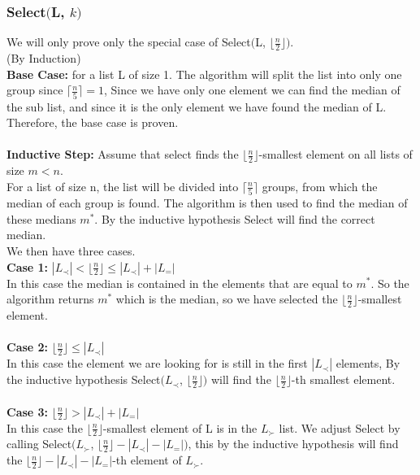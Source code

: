 \documentclass{article}
\begin{document}
      \subsubsection{Select$($L, $k)$} 
      We will only prove only the special case of Select$($L, $\lfloor \frac{n}{2} \rfloor)$. \\
        (By Induction) \\
        \textbf{Base Case:} for a list L of size 1. The algorithm will split the list into only one group since $\lceil \frac{n}{5} \rceil = 1$, Since we have only one element we can find the median of the sub list, and since it is the only element we have found the median of L. \\
        Therefore, the base case is proven. \\
        \\
        \textbf{Inductive Step:} Assume that select finds the $\lfloor \frac{n}{2} \rfloor$-smallest element on all lists of size $m < n$. \\
        For a list of size n, the list will be divided into $\lceil \frac{n}{5} \rceil$ groups, from which the median of each group is found. The algorithm is then used to find the median of these medians $m^{*}$. By the inductive hypothesis Select will find the correct median. \\
        We then have three cases. \\
        \textbf{Case 1:} $|L_{\prec}| < \lfloor \frac{n}{2} \rfloor \leq |L_{\prec}| + |L_{=}|$ \\
        In this case the median is contained in the elements that are equal to $m^{*}$. So the algorithm returns $m^{*}$ which is the median, so we have selected the $\lfloor \frac{n}{2} \rfloor$-smallest element. \\
        \\
        \textbf{Case 2:} $\lfloor \frac{n}{2} \rfloor \leq |L_{\prec}|$ \\
        In this case the element we are looking for is still in the first $|L_{\prec}|$ elements, By the inductive hypothesis Select$(L_{\prec}$, $\lfloor \frac{n}{2} \rfloor)$ will find the $\lfloor \frac{n}{2} \rfloor$-th smallest element. \\
        \\
        \textbf{Case 3:} $\lfloor \frac{n}{2} \rfloor > |L_{\prec}| + |L_{=}|$ \\
        In this case the $\lfloor \frac{n}{2} \rfloor$-smallest element of L is in the $L_{\succ}$ list.
        We adjust Select by calling Select$(L_{\succ}$, $\lfloor \frac{n}{2} \rfloor - |L_{\prec}| - |L_{=}|)$, this by the inductive hypothesis will find the $\lfloor \frac{n}{2} \rfloor - |L_{\prec}| - |L_{=}|$-th element of $L_{\succ}$. 
\end{document}
